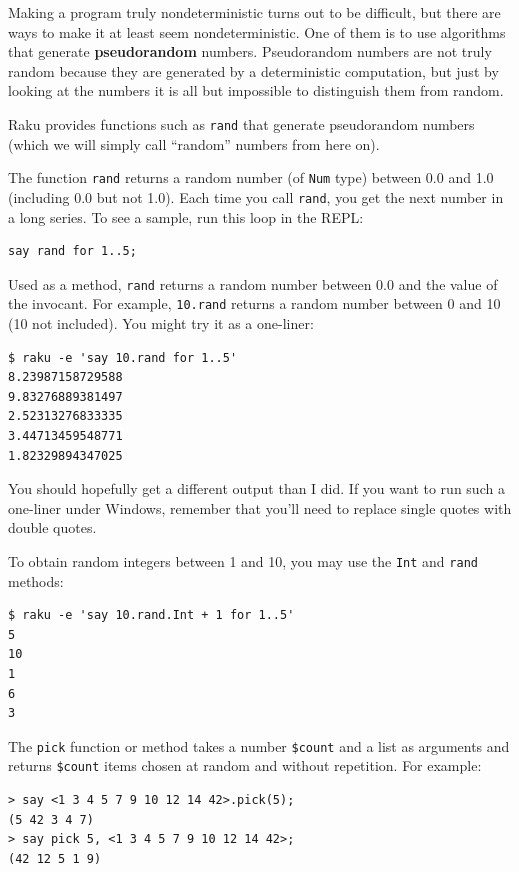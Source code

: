 Making a program truly nondeterministic turns out to be difficult,
but there are ways to make it at least seem nondeterministic.  One of
them is to use algorithms that generate {\bf pseudorandom} numbers.
Pseudorandom numbers are not truly random because they are generated
by a deterministic computation, but just by looking at the numbers it
is all but impossible to distinguish them from random.

Raku provides functions such as {\tt rand} that generate
pseudorandom numbers (which we will simply call ``random'' 
numbers from here on).

The function {\tt rand} returns a random number (of {\tt Num} 
type) between 0.0 and 1.0 (including 0.0 but not 1.0).  Each time you
call {\tt rand}, you get the next number in a long series.  To see a
sample, run this loop in the REPL:

\begin{verbatim}
say rand for 1..5;
\end{verbatim}

Used as a method, {\tt rand} returns a random number between 
0.0 and the value of the invocant. For example, {\tt 10.rand} 
returns a random number between 0 and 10 (10 not included). You
might try it as a one-liner:

\begin{verbatim}
$ raku -e 'say 10.rand for 1..5'
8.23987158729588
9.83276889381497
2.52313276833335
3.44713459548771
1.82329894347025
\end{verbatim}
 
You should hopefully get a different output than I did. If 
you want to run such a one-liner under Windows, remember 
that you'll need to replace single quotes with double quotes.

To obtain random integers between 1 and 10, you may use 
the {\tt Int} and {\tt rand} methods:

\begin{verbatim}
$ raku -e 'say 10.rand.Int + 1 for 1..5'
5
10
1
6
3
\end{verbatim}

The {\tt pick} function or method takes a number \verb'$count'  and a list as arguments and returns \verb'$count' items chosen at 
random and without repetition. For example:

\begin{verbatim}
> say <1 3 4 5 7 9 10 12 14 42>.pick(5);
(5 42 3 4 7)
> say pick 5, <1 3 4 5 7 9 10 12 14 42>;
(42 12 5 1 9)
\end{verbatim}

